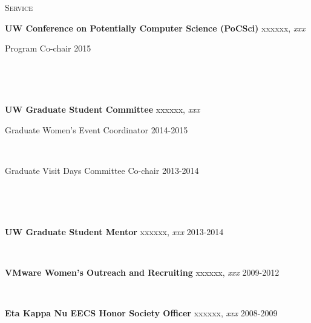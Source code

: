 \documentclass[10pt,times]{report}
\newlength{\sectiongap}
\newlength{\entrygap}
\newlength{\sectioncolwidth}
\newlength{\colgap}
\newlength{\stuffwidth}
\def\ifEqString#1#2{\def\testa{#1}\def\testb{#2}%
  \ifx\testa\testb}
\newenvironment{rtable}{
  \begin{minipage}{\textwidth}
  }{
  \end{minipage}
}
\newenvironment{rentry}[3][xxx]{
  \begin{minipage}[t]{\hsize}
    \textbf{#2}\ifEqString{#1}{xxx}\relax\else, \textit{#1}\fi
    \hspace{\stretch{1}} #3 \\
  }{
    \removelastskip
  \end{minipage}
  \\[\entrygap]  %
}
\newcommand{\rline}[2]{
  \begin{minipage}[t]{\hsize}
    #1 \hspace{\stretch{1}} #2
  \end{minipage} \\
}
\newenvironment{rsection}[1]{
  \begin{minipage}[t]{\sectioncolwidth}
    \textsc{#1}
  \end{minipage}
  \hspace{\colgap}
  \begin{minipage}[t]{\stuffwidth}
  }{
    \removelastskip
  \end{minipage}
  \\[\sectiongap]
}
\begin{document}
\begin{rtable}

  \begin{rsection}{Service}
    \begin{rentry}{UW Conference on Potentially
        Computer Science (PoCSci)}{}
      \rline{Program Co-chair}{2015}
       \vspace{-0.5em}
    \end{rentry}
    \begin{rentry}{UW Graduate Student Committee}{}
      \rline{Graduate Women's Event Coordinator}{2014-2015}
      \rline{Graduate Visit Days Committee Co-chair}{2013-2014}
      \vspace{-0.5em}
    \end{rentry}
    \begin{rentry}{UW Graduate Student Mentor}{2013-2014}
      \vspace{-0.5em}
    \end{rentry}
    \begin{rentry}{VMware Women's Outreach and Recruiting}{2009-2012}
       \vspace{-0.5em}
    \end{rentry}
    \begin{rentry}{Eta Kappa Nu EECS Honor Society Officer}{2008-2009}
      \vspace{-0.5em}
    \end{rentry}
  \end{rsection}


\end{rtable}
\end{document}
